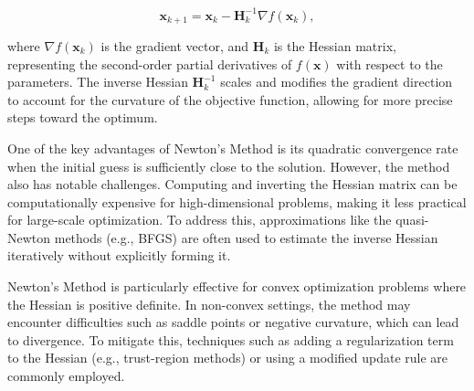 \begin{equation*}
\mathbf{x}_{k+1} = \mathbf{x}_k - \mathbf{H}_k^{-1} \nabla f(\mathbf{x}_k),
\end{equation*}

\noindent where $\nabla f(\mathbf{x}_k)$ is the gradient vector, and $\mathbf{H}_k$ is the Hessian matrix, representing the second-order partial derivatives of $f(\mathbf{x})$ with respect to the parameters. The inverse Hessian $\mathbf{H}_k^{-1}$ scales and modifies the gradient direction to account for the curvature of the objective function, allowing for more precise steps toward the optimum.

One of the key advantages of Newton's Method is its quadratic convergence rate when the initial guess is sufficiently close to the solution. However, the method also has notable challenges. Computing and inverting the Hessian matrix can be computationally expensive for high-dimensional problems, making it less practical for large-scale optimization. To address this, approximations like the quasi-Newton methods (e.g., BFGS) are often used to estimate the inverse Hessian iteratively without explicitly forming it.

Newton's Method is particularly effective for convex optimization problems where the Hessian is positive definite. In non-convex settings, the method may encounter difficulties such as saddle points or negative curvature, which can lead to divergence. To mitigate this, techniques such as adding a regularization term to the Hessian (e.g., trust-region methods) or using a modified update rule are commonly employed.







